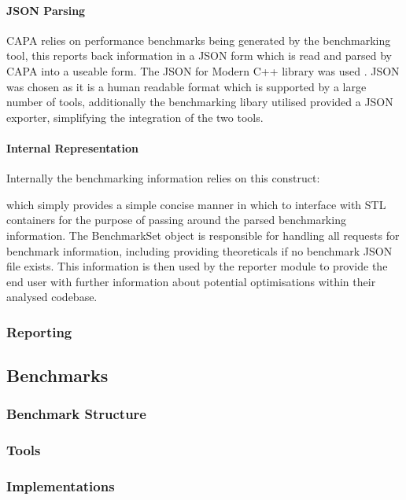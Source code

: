 \paragraph{JSON Parsing}
CAPA relies on performance benchmarks being generated by the benchmarking tool, this reports back
information in a JSON form which is read and parsed by CAPA into a useable form. The JSON for Modern
C++ library was used \cite{JSON}. JSON was chosen as it is a human readable format which is
supported by a large number of tools, additionally the benchmarking libary utilised provided a JSON
exporter, simplifying the integration of the two tools.

\paragraph{Internal Representation}
Internally the benchmarking information relies on this construct:

which simply provides a simple concise manner in which to interface with STL containers for the
purpose of passing around the parsed benchmarking information. The BenchmarkSet object is
responsible for handling all requests for benchmark information, including providing theoreticals if
no benchmark JSON file exists. This information is then used by the reporter module to provide the
end user with further information about potential optimisations within their analysed codebase.

\subsubsection{Reporting}


\subsection{Benchmarks}
\subsubsection{Benchmark Structure}

\subsubsection{Tools}

\subsubsection{Implementations}

